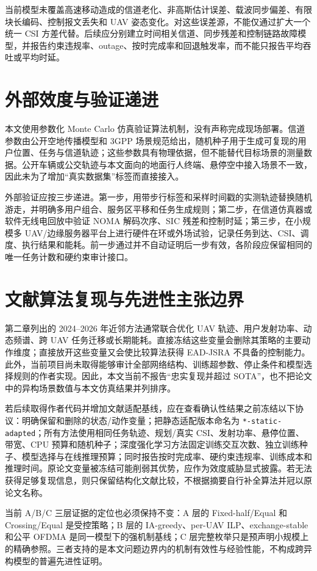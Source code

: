 当前模型未覆盖高速移动造成的信道老化、非高斯估计误差、载波同步偏差、有限块长编码、控制报文丢失和 UAV 姿态变化。对这些误差源，不能仅通过扩大一个统一 CSI 方差代替。后续应分别建立时间相关信道、同步残差和控制链路故障模型，并报告约束违规率、outage、按时完成率和回退触发率，而不能只报告平均吞吐或平均时延。

\section{外部效度与验证递进}
本文使用参数化 Monte Carlo 仿真验证算法机制，没有声称完成现场部署。信道参数由公开空地传播模型和 3GPP 场景规范给出，随机种子用于生成可复现的用户位置、任务与信道轨迹；这些参数具有物理依据，但不能替代目标场景的测量数据。公开车辆或公交轨迹与本文面向的地面行人终端、悬停空中接入场景不一致，因此未为了增加“真实数据集”标签而直接接入。

外部验证应按三步递进。第一步，用带步行标签和采样时间戳的实测轨迹替换随机游走，并明确多用户组合、服务区平移和任务生成规则；第二步，在信道仿真器或软件无线电回放中验证 NOMA 解码次序、SIC 残差和控制时延；第三步，在小规模多 UAV/边缘服务器平台上进行硬件在环或外场试验，记录任务到达、CSI、调度、执行结果和能耗。前一步通过并不自动证明后一步有效，各阶段应保留相同的唯一任务计数和硬约束审计接口。

\section{文献算法复现与先进性主张边界}
第二章列出的 2024--2026 年近邻方法通常联合优化 UAV 轨迹、用户发射功率、动态频谱、跨 UAV 任务迁移或长期能耗。直接冻结这些变量会删除其策略的主要动作维度；直接放开这些变量又会使比较算法获得 EAD-JSRA 不具备的控制能力。此外，当前项目尚未取得能够审计全部网络结构、训练超参数、停止条件和模型选择规则的作者实现。因此，本文当前不报告“忠实复现并超过 SOTA”，也不把论文中的异构场景数值与本文仿真结果并列排序。

若后续取得作者代码并增加文献适配基线，应在查看确认性结果之前冻结以下协议：明确保留和删除的状态/动作变量；把静态适配版本命名为 \texttt{*-static-adapted}；所有方法使用相同任务轨迹、规划/真实 CSI、发射功率、悬停位置、带宽、CPU 预算和随机种子；深度强化学习方法固定训练交互次数、独立训练种子、模型选择与在线推理预算；同时报告按时完成率、硬约束违规率、训练成本和推理时间。原论文变量被冻结可能削弱其优势，应作为效度威胁显式披露。若无法获得足够复现信息，则只保留结构化文献比较，不根据摘要自行补全算法并冠以原论文名称。

当前 A/B/C 三层证据的定位也必须保持不变：A 层的 Fixed-half/Equal 和 Crossing/Equal 是受控策略；B 层的 IA-greedy、per-UAV ILP、exchange-stable 和公平 OFDMA 是同一模型下的强机制基线；C 层完整枚举只是预声明小规模上的精确参照。三者支持的是本文问题边界内的机制有效性与经验性能，不构成跨异构模型的普遍先进性证明。

